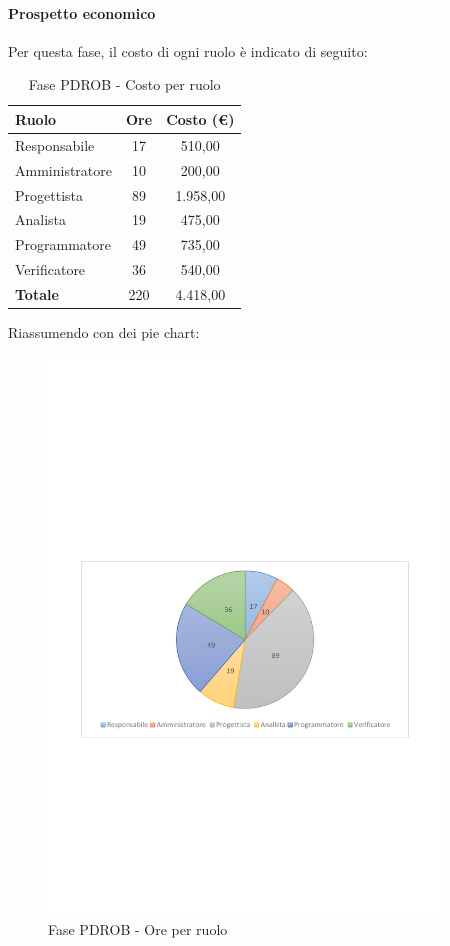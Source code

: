 \documentclass[../PianoProgetto.tex]{subfiles}
\begin{document}
	\paragraph{Prospetto economico}
					Per questa fase\g, il costo di ogni ruolo è indicato di seguito:
	\begin{table}[h]
		\centering
	
		\begin{tabular}{l * {2}{c}}
			\toprule
			\textbf{Ruolo} & \textbf{Ore} & \textbf{Costo (\euro{})} \\
			\midrule
			Responsabile &	17 & 510,00 \\
			Amministratore & 10 & 200,00 \\
			Progettista & 89 & 1.958,00 \\
			Analista & 19 & 475,00 \\
			Programmatore & 49 & 735,00 \\
			Verificatore & 36 & 540,00 \\
			\midrule		
			\textbf{Totale} & 220 & 4.418,00 \\
			\bottomrule	
		\end{tabular}
		\caption{Fase PDROB - Costo per ruolo}
		\label{tab:fasePDROB_costo}
	\end{table}
\vfill	
\newpage
\vfill
	Riassumendo con dei pie chart:
	\begin{figure}[!h]
		\centering
		\includegraphics[width=0.93\textwidth , trim=2cm 9.5cm 2cm 11cm]{grafici/PDROB/PDROB-ore-ruolo}
			\caption{Fase PDROB - Ore per ruolo}
		\label{fig:CircleChart-fasePDROB_ore_r}
	\end{figure}
\end{document}
